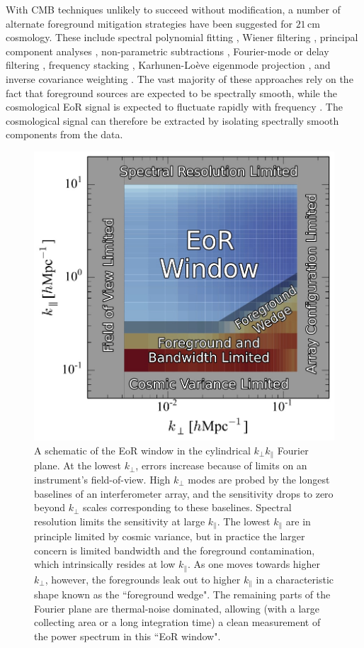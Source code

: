 \documentclass[twocolumn,aps,prd,nofootinbib,showpacs]{revtex4-1}
\begin{document}
With CMB techniques unlikely to succeed without modification, a number of alternate foreground mitigation strategies have been suggested for $21\,\textrm{cm}$ cosmology.  These include spectral polynomial fitting \cite{Wang2006,Liu2009a,Bowman2009,Liu2009b}, Wiener filtering \cite{Gleser2008}, principal component analyses \cite{Paciga2011,Liu2012,Masui2013,Paciga2013}, non-parametric subtractions \cite{Harker2009,Chapman2012,Chapman2013}, Fourier-mode or delay filtering \cite{Petrovic2011, Parsons2012b}, frequency stacking \cite{Cho2012}, Karhunen-Lo\`{e}ve eigenmode projection \cite{Shaw2014a,Shaw2014b}, and inverse covariance weighting \cite{Liu2011,Dillon2013,Dillon2014}.  The vast majority of these approaches rely on the fact that foreground sources are expected to be spectrally smooth, while the cosmological EoR signal is expected to fluctuate rapidly with frequency \cite{Oh2003}.  The cosmological signal can therefore be extracted by isolating spectrally smooth components from the data.

\begin{figure}[t] 
	\centering 
	\includegraphics[width=.45\textwidth]{EoRwindowCartoon.jpg}
	\caption{A schematic of the EoR window in the cylindrical $k_\perp k_\parallel$ Fourier plane.  At the lowest $k_\perp$, errors increase because of limits on an instrument's field-of-view.  High $k_\perp$ modes are probed by the longest baselines of an interferometer array, and the sensitivity drops to zero beyond $k_\perp$ scales corresponding to these baselines.  Spectral resolution limits the sensitivity at large $k_\parallel$.  The lowest $k_\parallel$ are in principle limited by cosmic variance, but in practice the larger concern is limited bandwidth and the foreground contamination, which intrinsically resides at low $k_\parallel$.  As one moves towards higher $k_\perp$, however, the foregrounds leak out to higher $k_\parallel$ in a characteristic shape known as the ``foreground wedge".  The remaining parts of the Fourier plane are thermal-noise dominated, allowing (with a large collecting area or a long integration time) a clean measurement of the power spectrum in this ``EoR window".}
	\label{fig:SchematicWedge}
\end{figure} 
\end{document}
